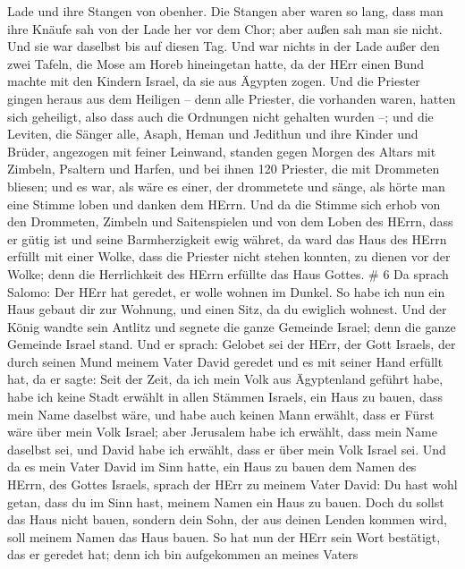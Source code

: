 Lade und ihre Stangen von obenher.  Die Stangen aber waren
so lang, dass man ihre Knäufe sah von der Lade her vor dem Chor; aber
außen sah man sie nicht. Und sie war daselbst bis auf diesen Tag.
 Und war nichts in der Lade außer den zwei Tafeln, die Mose
am Horeb hineingetan hatte, da der HErr einen Bund machte mit den
Kindern Israel, da sie aus Ägypten zogen.  Und die Priester
gingen heraus aus dem Heiligen -- denn alle Priester, die vorhanden
waren, hatten sich geheiligt, also dass auch die Ordnungen nicht
gehalten wurden --;  und die Leviten, die Sänger alle,
Asaph, Heman und Jedithun und ihre Kinder und Brüder, angezogen mit
feiner Leinwand, standen gegen Morgen des Altars mit Zimbeln, Psaltern
und Harfen, und bei ihnen 120 Priester, die mit Drommeten bliesen;
 und es war, als wäre es einer, der drommetete und sänge,
als hörte man eine Stimme loben und danken dem HErrn. Und da die Stimme
sich erhob von den Drommeten, Zimbeln und Saitenspielen und von dem
Loben des HErrn, dass er gütig ist und seine Barmherzigkeit ewig währet,
da ward das Haus des HErrn erfüllt mit einer Wolke,  dass
die Priester nicht stehen konnten, zu dienen vor der Wolke; denn die
Herrlichkeit des HErrn erfüllte das Haus Gottes. \# 6  Da
sprach Salomo: Der HErr hat geredet, er wolle wohnen im Dunkel.
 So habe ich nun ein Haus gebaut dir zur Wohnung, und einen
Sitz, da du ewiglich wohnest.  Und der König wandte sein
Antlitz und segnete die ganze Gemeinde Israel; denn die ganze Gemeinde
Israel stand.  Und er sprach: Gelobet sei der HErr, der Gott
Israels, der durch seinen Mund meinem Vater David geredet und es mit
seiner Hand erfüllt hat, da er sagte:  Seit der Zeit, da ich
mein Volk aus Ägyptenland geführt habe, habe ich keine Stadt erwählt in
allen Stämmen Israels, ein Haus zu bauen, dass mein Name daselbst wäre,
und habe auch keinen Mann erwählt, dass er Fürst wäre über mein Volk
Israel;  aber Jerusalem habe ich erwählt, dass mein Name
daselbst sei, und David habe ich erwählt, dass er über mein Volk Israel
sei.  Und da es mein Vater David im Sinn hatte, ein Haus zu
bauen dem Namen des HErrn, des Gottes Israels,  sprach der
HErr zu meinem Vater David: Du hast wohl getan, dass du im Sinn hast,
meinem Namen ein Haus zu bauen.  Doch du sollst das Haus
nicht bauen, sondern dein Sohn, der aus deinen Lenden kommen wird, soll
meinem Namen das Haus bauen.  So hat nun der HErr sein Wort
bestätigt, das er geredet hat; denn ich bin aufgekommen an meines Vaters
